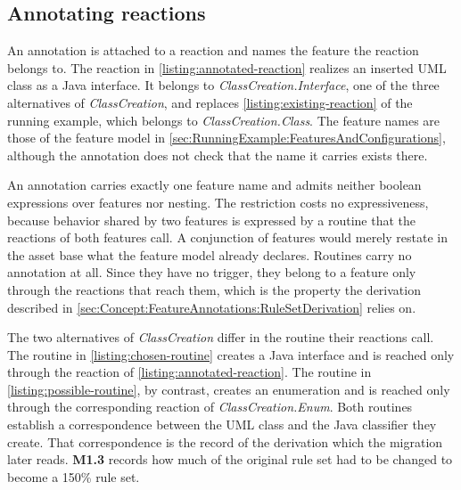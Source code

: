 \subsection{Annotating reactions}
\label{sec:Concept:FeatureAnnotations:AnnotatingReactions}

An annotation is attached to a reaction and names the feature the reaction belongs to.
The reaction in \autoref{listing:annotated-reaction} realizes an inserted UML class as a Java interface.
It belongs to \textit{ClassCreation.Interface}, one of the three alternatives of \textit{ClassCreation}, and replaces \autoref{listing:existing-reaction} of the running example, which belongs to \textit{ClassCreation.Class}.
The feature names are those of the feature model in \autoref{sec:RunningExample:FeaturesAndConfigurations}, although the annotation does not check that the name it carries exists there.



An annotation carries exactly one feature name and admits neither boolean expressions over features nor nesting.
The restriction costs no expressiveness, because behavior shared by two features is expressed by a routine that the reactions of both features call.
A conjunction of features would merely restate in the asset base what the feature model already declares.
Routines carry no annotation at all.
Since they have no trigger, they belong to a feature only through the reactions that reach them, which is the property the derivation described in \autoref{sec:Concept:FeatureAnnotations:RuleSetDerivation} relies on.




The two alternatives of \textit{ClassCreation} differ in the routine their reactions call.
The routine in \autoref{listing:chosen-routine} creates a Java interface and is reached only through the reaction of \autoref{listing:annotated-reaction}.
The routine in \autoref{listing:possible-routine}, by contrast, creates an enumeration and is reached only through the corresponding reaction of \textit{ClassCreation.Enum}.
Both routines establish a correspondence between the UML class and the Java classifier they create.
That correspondence is the record of the derivation which the migration later reads.
\textbf{M1.3} records how much of the original rule set had to be changed to become a 150\% rule set.

